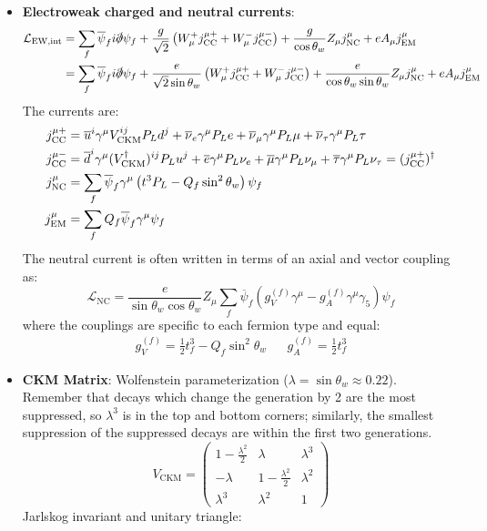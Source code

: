 \documentclass[11pt, oneside]{article}   	%
\theoremstyle{definition}
\numberwithin{equation}{subsection}		%
\begin{document}
\begin{itemize}
	\item \textbf{Electroweak charged and neutral currents}:
	\begin{align}
		\mathcal L_\mathrm{EW, int} &= \sum_f \overline\psi_f i\slashed\partial\psi_f + \frac{g}{\sqrt 2} \left( W_\mu^+ j_\mathrm{CC}^{\mu 
		+} + W_\mu^- j_\mathrm{CC}^{\mu -} \right) + \frac{g}{\cos\theta_w} Z_\mu j_\mathrm{NC}^\mu + e A_\mu j_\mathrm{EM}^\mu \\
		&= \sum_f \overline\psi_f i\slashed\partial\psi_f + \frac{e}{\sqrt 2\sin\theta_w} \left( W_\mu^+ j_\mathrm{CC}^{\mu 
		+} + W_\mu^- j_\mathrm{CC}^{\mu -} \right) + \frac{e}{\cos\theta_w\sin\theta_w} Z_\mu j_\mathrm{NC}^\mu + e A_\mu 
		j_\mathrm{EM}^\mu
	\end{align}
	The currents are:
	\begin{align}
	j_{\textnormal{CC}}^{\mu +} &= \overline u^i \gamma^\mu V^{ij}_\mathrm{CKM} P_L d^j +  \overline\nu_e \gamma^\mu P_L e + \overline\nu_\mu \gamma^\mu P_L \mu + \overline\nu_\tau \gamma^\mu P_L \tau \\
	j_{\textnormal{CC}}^{\mu -} &= \overline d^i \gamma^\mu (V_\mathrm{CKM}^\dagger)^{ij} P_L u^j + \overline e \gamma^\mu 
	P_L\nu_e + \overline \mu \gamma^\mu P_L \nu_\mu + \overline\tau \gamma^\mu P_L\nu_\tau = (j_\mathrm{CC}^{\mu +})^\dagger  
	\\
		j_\mathrm{NC}^\mu &= \sum_f \overline\psi_f \gamma^\mu \left(t^3 P_L - Q_f\sin^2\theta_w \right) \psi_f \\
		j_\mathrm{EM}^\mu &= \sum_f Q_f \overline \psi_f \gamma^\mu\psi_f
	\end{align}
	The neutral current is often written in terms of an axial and vector coupling as:
	\begin{equation}
		\mathcal L_\mathrm{NC} = \frac{e}{\sin\theta_w \cos\theta_w} Z_\mu \sum_f \overline\psi_f \left(g_V^{(f)}\gamma^\mu - 
		g_A^{(f)}\gamma^\mu\gamma_5\right) \psi_f
	\end{equation}
	where the couplings are specific to each fermion type and equal:
	\begin{align}
		g_V^{(f)} = \frac{1}{2} t^3_f - Q_f\sin^2\theta_w && g_A^{(f)} = \frac{1}{2} t^3_f
	\end{align}
	
	\item \textbf{CKM Matrix}: Wolfenstein parameterization ($\lambda = \sin\theta_w\approx 0.22$). Remember that decays which 
	change the generation by 2 are the most suppressed, so $\lambda^3$ is in the top and bottom corners; similarly, the smallest 
	suppression of the suppressed decays are within the first two generations. 
	\begin{equation}
	V_\mathrm{CKM} = \begin{pmatrix} 1 - \frac{\lambda^2}{2} & \lambda & \lambda^3 \\
	-\lambda & 1 - \frac{\lambda^2}{2} & \lambda^2 \\
	\lambda^3 & \lambda^2 & 1
	\end{pmatrix}
	\end{equation}
	Jarlskog invariant and unitary triangle:
	

\end{itemize}
\end{document}
